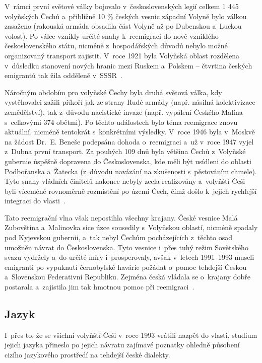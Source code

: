V~rámci první světové války bojovalo v~československých legií celkem 1 445 volyňských Čechů a~přibližně 10 \% českých vesnic západní Volyně bylo válkou zasaženo (rakouská armáda obsadila část Volyně až po Dubenskou a~Luckou volost). Po válce vznikly určité snahy k~reemigraci do nově vzniklého československého státu, nicméně z~hospodářských důvodů nebylo možné organizovaný transport zajistit. V~roce 1921 byla Volyňská oblast rozdělena v~důsledku stanovení nových hranic mezi Ruskem a~Polskem -- čtvrtina českých emigrantů tak žila odděleně v~SSSR~\parencite{Hofman2020}.

Náročným obdobím pro volyňské Čechy byla druhá světová válka, kdy vystěhovalci zažili příkoří jak ze strany Rudé armády (např. násilná kolektivizace zemědělství), tak z~důvodu nacistické invaze (např. vypálení Českého Malína s~celkovými 374 obětmi). Po těchto událostech bylo téma reemigrace znovu aktuální, nicméně tentokrát s~konkrétními výsledky. V~roce 1946 byla v~Moskvě na žádost Dr.~E. Beneše podepsána dohoda o~reemigraci a~už v~roce 1947 vyjel z~Dubna první transport. Za pouhých 109 dnů byla většina Čechů z~Volyňské gubernie úspěšně dopravena do Československa, kde měli být usídleni do oblasti Podbořanska a~Žatecka (z~důvodu navázání na zkušenosti s~pěstováním chmele). Tyto snahy vládních činitelů nakonec nebyly zcela realizovány a~volyňští Češi byli víceméně rovnoměrně rozmístění po území Čech, čímž došlo k~jejich rychlejší integraci do vlasti~\parencite{Hofman2020}.

Tato reemigrační vlna však nepostihla všechny krajany. České vesnice Malá Zubovština a~Malinovka sice úzce sousedily s~Volyňskou oblastí, nicméně spadaly pod Kyjevskou gubernii, a~tak nebyl Čechům pocházejících z~těchto osad umožněn návrat do Československa. Tyto vesnice i~přes tuhý režim Sovětského svazu vydržely a~do určité míry i~prosperovaly, avšak v~letech 1991--1993 museli emigranti po vypuknutí černobylské havárie požádat o~pomoc tehdejší Českou a~Slovenskou Federativní Republiku. Zejména česká vládala se o~krajany dobře postarala a~zajistila jim tak hmotnou pomoc při reemigraci~\parencite{Hofman2020}.

\hypertarget{jazyk-1}{%
\subsection*{Jazyk}\label{jazyk-1}}

I~přes to, že se všichni volyňští Češi v~roce 1993 vrátili nazpět do vlasti, studium jejich jazyka přineslo po jejich návratu zajímavé poznatky ohledně působení cizího jazykového prostředí na tehdejší české dialekty.


